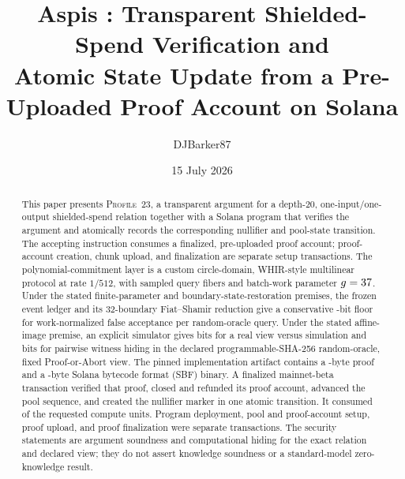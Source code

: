 \documentclass[11pt]{article}
\title{Aspis \Profile: Transparent Shielded-Spend Verification and\\
Atomic State Update from a Pre-Uploaded Proof Account on Solana}
\author{DJBarker87}
\date{15 July 2026}
\theoremstyle{definition}
\theoremstyle{remark}
\newcommand{\Profile}{\textsc{Profile~23}}
\begin{document}
\maketitle

\begin{abstract}
This paper presents \Profile, a transparent argument for a depth-20,
one-input/one-output shielded-spend relation together with a Solana program
that verifies the argument and atomically records the corresponding nullifier
and pool-state transition.  The accepting instruction consumes a finalized,
pre-uploaded proof account; proof-account creation, chunk upload, and
finalization are separate setup transactions.  The polynomial-commitment
layer is a custom circle-domain, WHIR-style multilinear protocol at rate
$1/512$, with \ProfileQueryCount{} sampled query fibers and batch-work
parameter $g=37$.  Under the stated finite-parameter and
boundary-state-restoration premises, the frozen event ledger and its
32-boundary Fiat--Shamir reduction give a conservative
\ProfileSoundnessBits-bit floor for work-normalized false acceptance per
random-oracle query.  Under the stated affine-image premise, an explicit simulator gives
\ProfileSimulationBits{} bits for a real view versus simulation and
\ProfilePairwiseBits{} bits for pairwise witness hiding in the declared
programmable-SHA-256 random-oracle, fixed Proof-or-Abort view.  The pinned
implementation artifact contains a \ProfileProofBytes-byte proof and a
\ProfileSbfBytes-byte Solana bytecode format (SBF) binary.  A finalized
mainnet-beta transaction verified that proof, closed and refunded its proof
account, advanced the pool sequence, and created the nullifier marker in one
atomic transition.  It consumed \ProfileMainnetComputeUnits{} of the
\ProfileComputeLimit{} requested compute units.  Program deployment, pool and
proof-account setup, proof upload, and proof finalization were separate
transactions.  The security statements are argument soundness and
computational hiding for the exact relation and declared view; they do not
assert knowledge soundness or a standard-model zero-knowledge result.
\end{abstract}
















\appendix




\end{document}
